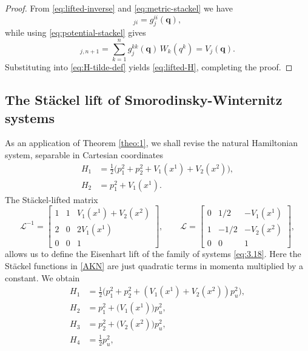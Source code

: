 \documentclass[10pt]{amsart}
\numberwithin{equation}{section}
\theoremstyle{definition}
\begin{document}
\begin{proof}
	From \eqref{eq:lifted-inverse} and \eqref{eq:metric-stackel} we have
	\begin{equation}
		[\mathcal{L}^{-1}]_{ji}=g^{ii}_j(\boldsymbol{q}),
	\end{equation}
	while using \eqref{eq:potential-stackel} gives
	\begin{equation}
		[\mathcal{L}^{-1}]_{j,n+1}
		= \sum_{k=1}^n g^{kk}_j(\boldsymbol{q})\, W_k(q^k)
		= V_j(\boldsymbol{q}).
	\end{equation}
	Substituting into \eqref{eq:H-tilde-def} yields \eqref{eq:lifted-H}, completing
	the proof.
\end{proof}

	
\subsection{The St\"ackel lift of Smorodinsky-Winternitz systems}
As an application of Theorem \ref{theo:1}, we shall revise the natural Hamiltonian system, separable in Cartesian coordinates
	\begin{equation} \label{eq:3.18}
		\begin{split}
			H_1 &= \frac{1}{2}\big(p_1^2+p_2^2+V_1(x^1)+V_2(x^2)\big), \\
			H_2 &= p_1^2+V_1(x^1).
		\end{split}
	\end{equation}The St\"ackel-lifted matrix
	\begin{equation} \label{Stackel 1}
		\mathcal{L}^{-1}= 
		\begin{bmatrix}
			1 & 1 & V_1(x^1)+V_2(x^2) \\ 
			2 & 0 & 2 V_1(x^1) \\ 
			0 & 0 & 1
		\end{bmatrix}, \qquad \mathcal{L}= 
		\begin{bmatrix}
			0 & 1/2 & -V_1(x^1) \\ 
			1 & -1/2 & -V_2(x^2) \\ 
			0 & 0 & 1
		\end{bmatrix},
	\end{equation}
	allows us to define the Eisenhart lift of the family of systems \eqref{eq:3.18}. Here the St\"ackel functions in \eqref{AKN} are just quadratic terms in momenta multiplied by a constant. We obtain
	\begin{equation} \label{eq:Lor lift1}
		\begin{split}
			H_1 &= \frac{1}{2}\Big(p_1^2+p_2^2+(V_1(x^1)+V_2(x^2))p_u^2\Big), \\
			H_2 &= p_1^2+\Big(V_1(x^1)\Big)p_u^2,\\
			H_3 &= p_2^2+\Big(V_2(x^2)\Big)p_u^2,\\
			H_4 &= \frac{1}{2}p_u^2,
		\end{split}
	\end{equation}
\end{document}
